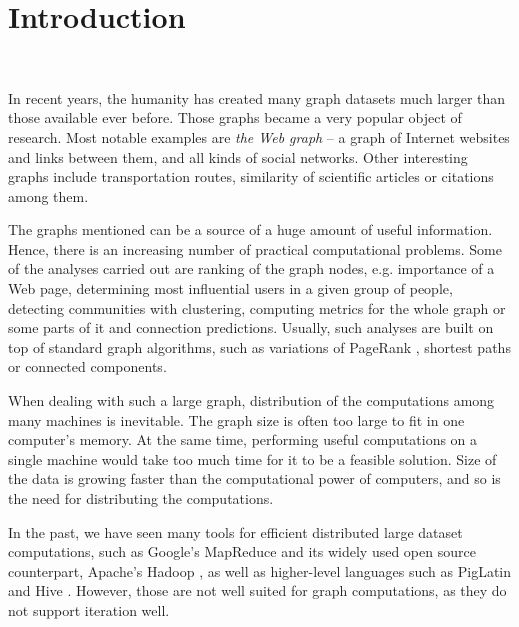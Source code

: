 
\chapter{Introduction}\
In recent years, the humanity has created many graph datasets much larger than those available ever before.
Those graphs became a very popular object of research. Most notable examples are \emph{the Web graph} -- a graph of Internet websites and links between them, and all kinds of social networks. Other interesting graphs include transportation routes, similarity of scientific articles or citations among them.


The graphs mentioned can be a source of a huge amount of useful information. Hence, there is an increasing number of practical computational problems.
Some of the analyses carried out are ranking of the graph nodes, e.g. importance of a Web page, determining most influential users in a given group of people, detecting communities with clustering, computing metrics for the whole graph or some parts of it and connection predictions.
Usually, such analyses are built on top of standard graph algorithms, such as variations of PageRank \cite{pagerank}, shortest paths or connected components.

When dealing with such a large graph, distribution of the computations among many machines is inevitable. The graph size is often too large to fit in one computer's memory. At the same time, performing useful computations on a single machine would take too much time for it to be a feasible solution. Size of the data is growing faster than the computational power of computers, and so is the need for distributing the computations.

In the past, we have seen many tools for efficient distributed large dataset computations, such as Google's MapReduce \cite{mapreduce} and its widely used open source counterpart, Apache's Hadoop \cite{hadoop}, as well as higher-level languages such as PigLatin \cite{piglatin} and Hive \cite{hive}. However, those are not well suited for graph computations, as they do not support iteration well.

